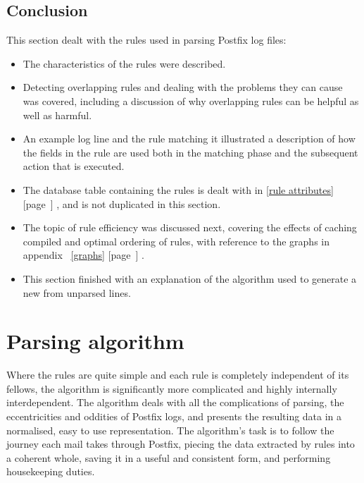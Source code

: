 \documentclass[a4paper,12pt,draft]{article}
\newcommand{\refwithpage}[1]{%
    \empty{}\ref{#1} [page~\pageref{#1}]%
}
\newcommand{\sectionref}[1]{%
    \textsection{}\refwithpage{#1}%
}
\begin{document}
\subsection{Conclusion}

This section dealt with the rules used in parsing Postfix log files:

\begin{itemize}

    \item The characteristics of the rules were described.

    \item Detecting overlapping rules and dealing with the problems they
        can cause was covered, including a discussion of why overlapping
        rules can be helpful as well as harmful.

    \item An example log line and the rule matching it illustrated a
        description of how the fields in the rule are used both in the
        matching phase and the subsequent action that is executed.

    \item The database table containing the rules is dealt with in
        \sectionref{rule attributes}, and is not duplicated in this
        section.

    \item The topic of rule efficiency was discussed next, covering the
        effects of caching compiled \regexes{} and optimal ordering of
        rules, with reference to the graphs in
        appendix~\refwithpage{graphs}.

    \item This section finished with an explanation of the algorithm used
        to generate a new \regex{} from unparsed lines.

\end{itemize}

\section{Parsing algorithm}

\label{parsing-algorithm}

Where the rules are quite simple and each rule is completely independent of
its fellows, the algorithm is significantly more complicated and highly
internally interdependent.  The algorithm deals with all the complications
of parsing, the eccentricities and oddities of Postfix logs, and presents
the resulting data in a normalised, easy to use representation.  The
algorithm's task is to follow the journey each mail takes through Postfix,
piecing the data extracted by rules into a coherent whole, saving it in a
useful and consistent form, and performing housekeeping duties.
\end{document}

